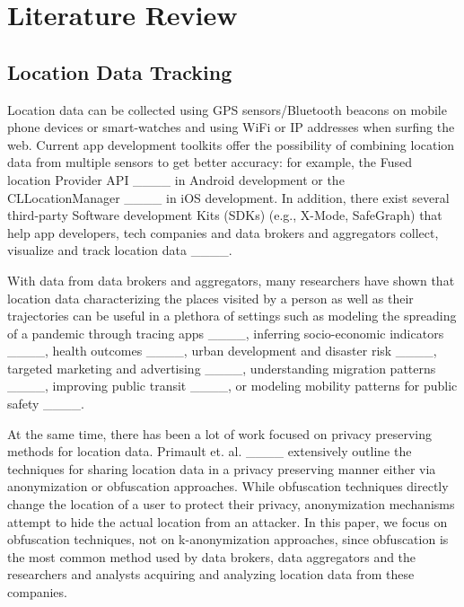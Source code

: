 \section{Literature Review}
\subsection{Location Data Tracking}
Location data can be collected using GPS sensors/Bluetooth beacons on mobile phone devices or smart-watches and using WiFi or IP addresses when surfing the web. Current app development toolkits offer the possibility of combining location data from multiple sensors to get better accuracy: for example, the Fused location Provider API ____ in Android development or the CLLocationManager ____ in iOS development. 
In addition, there exist several third-party Software development Kits (SDKs) (e.g., X-Mode, SafeGraph) that help app developers, tech companies and data brokers and aggregators collect, visualize and track location data ____.  

With data from data brokers and aggregators, 
many researchers have shown that location data characterizing the places visited by a person as well as their trajectories can be useful in a plethora of settings such as modeling the spreading of a pandemic through tracing apps ____, 
inferring socio-economic indicators ____, health outcomes ____, urban development and disaster risk ____, 
targeted marketing and advertising ____,
understanding migration patterns ____,
improving public transit ____, 
or modeling mobility patterns for public safety ____.

At the same time, there has been a lot of work focused on privacy preserving methods for location data. 
Primault et. al. ____ extensively outline the techniques for sharing location data in a privacy preserving manner either via anonymization or obfuscation approaches. While
obfuscation techniques directly change the location of a user to protect their privacy, anonymization mechanisms attempt to hide the actual location from an attacker. 
In this paper, we focus on obfuscation techniques, not on k-anonymization approaches, since obfuscation is the most common method used by data brokers, data aggregators and the researchers and analysts acquiring and analyzing location data from these companies.  




